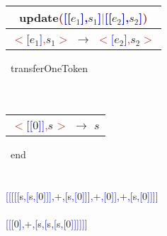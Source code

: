 \documentclass{article}
\newcommand{\tm}[1]{\textcolor{brown}{#1}}
\newcommand{\tmb}[1]{\textcolor{blue}{#1}}
\newcommand{\ntm}[1]{\colorbox{blue!30}{$#1$}}
\newcommand{\osr}[3]{
\begin{tabular}{ c }
 #2 \\
 \hline
 #3
\end{tabular}~{\tiny #1}
}
\begin{document}
~\\\\\osr{transferOneToken}{update\tm{(}\tmb{[}\tmb{[}\ntm{e_{1}}\tmb{]}\tmb{,}\ntm{s_{1}}\tmb{]}\tm{$|$}\tmb{[}\tmb{[}\ntm{e_{2}}\tmb{]}\tmb{,}\ntm{s_{2}}\tmb{]}\tm{)}}{\tm{$<$}\tmb{[}\ntm{e_{1}}\tmb{]}\tm{,}\ntm{s_{1}}\tm{$>$} $\to$ \tm{$<$}\tmb{[}\ntm{e_{2}}\tmb{]}\tm{,}\ntm{s_{2}}\tm{$>$}}\\
~\\\\\osr{end}{}{\tm{$<$}\tmb{[}\tmb{[}0\tmb{]}\tmb{]}\tm{,}\ntm{s_{}}\tm{$>$} $\to$ \ntm{s_{}}}\\
~\\\\\tmb{[}\tmb{[}\tmb{[}\tmb{[}\tmb{[}s\tmb{,}\tmb{[}s\tmb{,}\tmb{[}0\tmb{]}\tmb{]}\tmb{]}\tmb{,}+\tmb{,}\tmb{[}s\tmb{,}\tmb{[}0\tmb{]}\tmb{]}\tmb{]}\tmb{,}+\tmb{,}\tmb{[}0\tmb{]}\tmb{]}\tmb{,}+\tmb{,}\tmb{[}s\tmb{,}\tmb{[}0\tmb{]}\tmb{]}\tmb{]}\tmb{]}
~\\\\\tmb{[}\tmb{[}\tmb{[}0\tmb{]}\tmb{,}+\tmb{,}\tmb{[}s\tmb{,}\tmb{[}s\tmb{,}\tmb{[}s\tmb{,}\tmb{[}0\tmb{]}\tmb{]}\tmb{]}\tmb{]}\tmb{]}\tmb{]}
\end{document}
